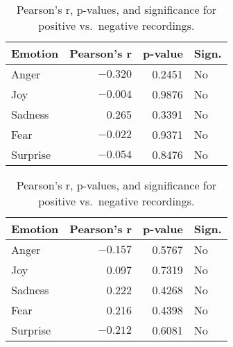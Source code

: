 \begin{table}[H]
    \centering
    \begin{subtable}{0.45\textwidth}
      \centering
      \caption*{\textbf{Positive Recordings}}
      \begin{tabular}{lrrl}
        \toprule
        \textbf{Emotion} & \textbf{Pearson’s r} & \textbf{p-value} & \textbf{Sign.} \\
        \midrule
        Anger    & $-0.320$ & 0.2451 & No \\
        Joy      & $-0.004$ & 0.9876 & No \\
        Sadness  & \phantom{$-$}0.265 & 0.3391 & No \\
        Fear     & $-0.022$ & 0.9371 & No \\
        Surprise & $-0.054$ & 0.8476 & No \\
        \bottomrule
      \end{tabular}
      \label{tab:rq1_corr_pos}
    \end{subtable}\hfill
    \begin{subtable}{0.45\textwidth}
      \centering
      \caption*{\textbf{Negative Recordings}}
      \begin{tabular}{lrrl}
        \toprule
        \textbf{Emotion} & \textbf{Pearson’s r} & \textbf{p-value} & \textbf{Sign.} \\
        \midrule
        Anger    & $-0.157$ & 0.5767 & No \\
        Joy      &  \phantom{$-$}0.097 & 0.7319 & No \\
        Sadness  &  \phantom{$-$}0.222 & 0.4268 & No \\
        Fear     &  \phantom{$-$}0.216 & 0.4398 & No \\
        Surprise & $-0.212$ & 0.6081 & No \\
        \bottomrule
      \end{tabular}
      \label{tab:rq1_corr_neg}
    \end{subtable}
    \caption{Pearson’s r, p-values, and significance for positive vs.\ negative recordings.}
    \label{tab:rq1_corr_pos_neg_side_by_side}
  \end{table}
  


